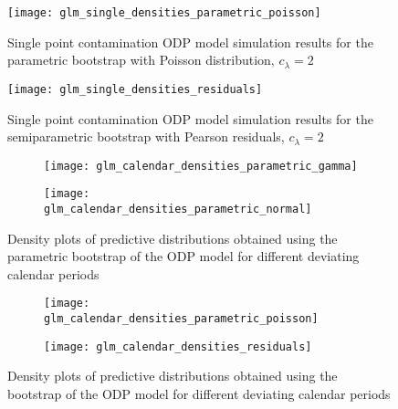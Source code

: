 \documentclass[a4paper]{book}
\begin{document}
\begin{landscape}
  \begin{figure}
    \centering
    \texttt{[image: glm\_single\_densities\_parametric\_poisson]}
    \caption{Single point contamination ODP model simulation results for the parametric bootstrap with Poisson distribution, $c_\lambda = 2$}
    \label{fig:odp-single-param-pois}
  \end{figure}
\end{landscape}

\begin{landscape}
  \begin{figure}
    \centering
    \texttt{[image: glm\_single\_densities\_residuals]}
    \caption{Single point contamination ODP model simulation results for the semiparametric bootstrap with Pearson residuals, $c_\lambda = 2$}
    \label{fig:odp-single-semiparam}
  \end{figure}
\end{landscape}

\begin{landscape}
  \begin{figure}
    \begin{subfigure}{0.5\linewidth}
      \centering
      \texttt{[image: glm\_calendar\_densities\_parametric\_gamma]}
      \label{fig:odp-calendar-param-gamma}
    \end{subfigure}
    \begin{subfigure}{0.5\linewidth}
      \centering
      \texttt{[image: glm\_calendar\_densities\_parametric\_normal]}
      \label{fig:odp-calendar-param-norm}
    \end{subfigure}
    \caption{Density plots of predictive distributions obtained using the parametric bootstrap of the ODP model for different deviating calendar periods}
  \end{figure}
\end{landscape}

\begin{landscape}
  \begin{figure}
    \begin{subfigure}{0.5\linewidth}
      \centering
      \texttt{[image: glm\_calendar\_densities\_parametric\_poisson]}
      \label{fig:odp-calendar-param-pois}
    \end{subfigure}
    \begin{subfigure}{0.5\linewidth}
      \centering
      \texttt{[image: glm\_calendar\_densities\_residuals]}
      \label{fig:odp-calendar-semiparam}
    \end{subfigure}
    \caption{Density plots of predictive distributions obtained using the bootstrap of the ODP model for different deviating calendar periods}
  \end{figure}
\end{landscape}
\end{document}
